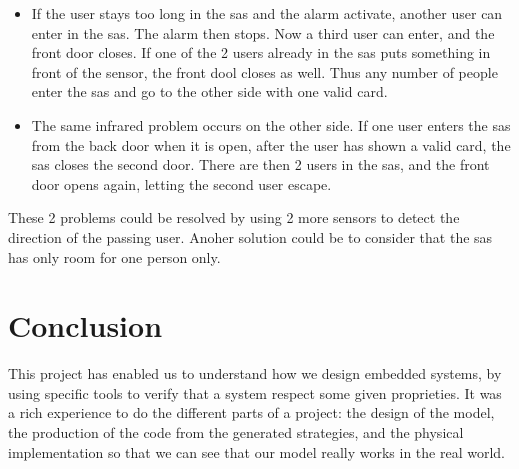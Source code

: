\begin{itemize}
	\item If the user stays too long in the sas and the alarm activate, another user can enter in the sas. The alarm then stops. Now a third user can enter, and the front door closes. If one of the 2 users already in the sas puts something in front of the sensor, the front dool closes as well. Thus any number of people enter the sas and go to the other side with one valid card.
    
    \item The same infrared problem occurs on the other side. If one user enters the sas from the back door when it is open, after the user has shown a valid card, the sas closes the second door. There are then 2 users in the sas, and the front door opens again, letting the second user escape.
	
\end{itemize}

These 2 problems could be resolved by using 2 more sensors to detect the direction of the passing user. Anoher solution could be to consider that the sas has only room for one person only.

\section{Conclusion}
This project has enabled us to understand how we design embedded systems, by using specific tools to verify that a system respect some given proprieties. It was a rich experience to do the different parts of a project: the design of the model, the production of the code from the generated strategies, and the physical implementation so that we can see that our model really works in the real world.




